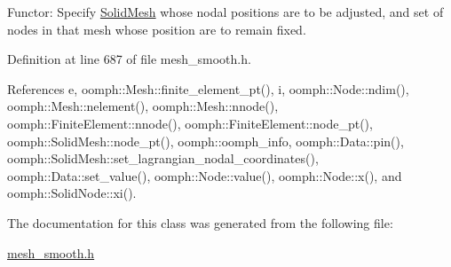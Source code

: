 Functor\+: Specify \hyperlink{classoomph_1_1SolidMesh}{Solid\+Mesh} whose nodal positions are to be adjusted, and set of nodes in that mesh whose position are to remain fixed. 



Definition at line 687 of file mesh\+\_\+smooth.\+h.



References e, oomph\+::\+Mesh\+::finite\+\_\+element\+\_\+pt(), i, oomph\+::\+Node\+::ndim(), oomph\+::\+Mesh\+::nelement(), oomph\+::\+Mesh\+::nnode(), oomph\+::\+Finite\+Element\+::nnode(), oomph\+::\+Finite\+Element\+::node\+\_\+pt(), oomph\+::\+Solid\+Mesh\+::node\+\_\+pt(), oomph\+::oomph\+\_\+info, oomph\+::\+Data\+::pin(), oomph\+::\+Solid\+Mesh\+::set\+\_\+lagrangian\+\_\+nodal\+\_\+coordinates(), oomph\+::\+Data\+::set\+\_\+value(), oomph\+::\+Node\+::value(), oomph\+::\+Node\+::x(), and oomph\+::\+Solid\+Node\+::xi().



The documentation for this class was generated from the following file\+:\begin{DoxyCompactItemize}
\item 
\hyperlink{mesh__smooth_8h}{mesh\+\_\+smooth.\+h}\end{DoxyCompactItemize}
